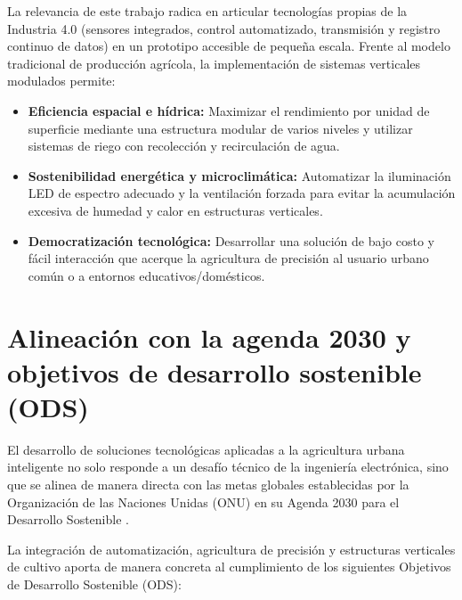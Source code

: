 La relevancia de este trabajo radica en articular tecnologías propias de la Industria 4.0 (sensores integrados, control automatizado, transmisión y registro continuo de datos) en un prototipo accesible de pequeña escala. Frente al modelo tradicional de producción agrícola, la implementación de sistemas verticales modulados permite:
\begin{itemize}
    \item \textbf{Eficiencia espacial e hídrica:} Maximizar el rendimiento por unidad de superficie mediante una estructura modular de varios niveles y utilizar sistemas de riego con recolección y recirculación de agua.
    \item \textbf{Sostenibilidad energética y microclimática:} Automatizar la iluminación LED de espectro adecuado y la ventilación forzada para evitar la acumulación excesiva de humedad y calor en estructuras verticales.
    \item \textbf{Democratización tecnológica:} Desarrollar una solución de bajo costo y fácil interacción que acerque la agricultura de precisión al usuario urbano común o a entornos educativos/domésticos.
\end{itemize}

\section{Alineación con la agenda 2030 y objetivos de desarrollo sostenible (ODS)}
\label{sec:ods_onu}

El desarrollo de soluciones tecnológicas aplicadas a la agricultura urbana inteligente no solo responde a un desafío técnico de la ingeniería electrónica, sino que se alinea de manera directa con las metas globales establecidas por la Organización de las Naciones Unidas (ONU) en su Agenda 2030 para el Desarrollo Sostenible \cite{onu2015agenda}. 

La integración de automatización, agricultura de precisión y estructuras verticales de cultivo aporta de manera concreta al cumplimiento de los siguientes Objetivos de Desarrollo Sostenible (ODS):

